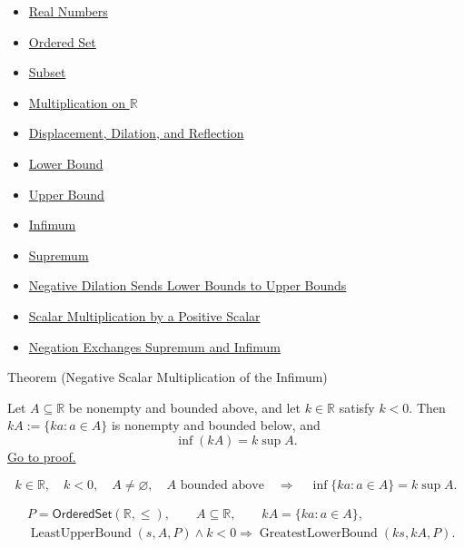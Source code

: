 \begin{dependencies}
\begin{itemize}
  \item \hyperref[def:reals]{Real Numbers}
  \item \hyperref[def:ordered-set]{Ordered Set}
  \item \hyperref[def:subset]{Subset}
  \item \hyperref[def:multiplication-on-r]{Multiplication on $\mathbb{R}$}
  \item \hyperref[def:displacement-dilation-reflection]{Displacement, Dilation, and Reflection}
  \item \hyperref[def:real-lower-bound]{Lower Bound}
  \item \hyperref[def:real-upper-bound]{Upper Bound}
  \item \hyperref[def:infimum]{Infimum}
  \item \hyperref[def:supremum]{Supremum}
  \item \hyperref[prop:negative-dilation-sends-lower-to-upper-bounds]{Negative Dilation Sends Lower Bounds to Upper Bounds}
  \item \hyperref[thm:scalar-mult-positive]{Scalar Multiplication by a Positive Scalar}
  \item \hyperref[thm:negation-exchange-sup-inf]{Negation Exchanges Supremum and Infimum}
\end{itemize}
\end{dependencies}

\begin{theorembox}{Theorem (Negative Scalar Multiplication of the Infimum)}
\begin{theorem}
\label{thm:negative-scalar-mult-infimum}
Let $A\subseteq\mathbb{R}$ be nonempty and bounded above, and let
$k\in\mathbb{R}$ satisfy $k<0$.  Then $kA:=\{ka:a\in A\}$ is nonempty and
bounded below, and
\[
  \inf(kA)=k\sup A.
\]
\hyperref[prf:negative-scalar-mult-infimum]{Go to proof.}
\end{theorem}
\end{theorembox}

\begin{remark*}
\[
k\in\mathbb{R},\quad k<0,\quad A\neq\varnothing,\quad A\text{ bounded above}
\quad\Longrightarrow\quad
\inf\{ka:a\in A\}=k\sup A.
\]
\end{remark*}

\begin{remark*}
\[
\begin{aligned}
&P=\mathsf{OrderedSet}(\mathbb{R},\leq),\qquad A\subseteq\mathbb{R},\qquad kA=\{ka:a\in A\},\\
&\operatorname{LeastUpperBound}(s,A,P)\land k<0
\Longrightarrow
\operatorname{GreatestLowerBound}(ks,kA,P).
\end{aligned}
\]
\end{remark*}

